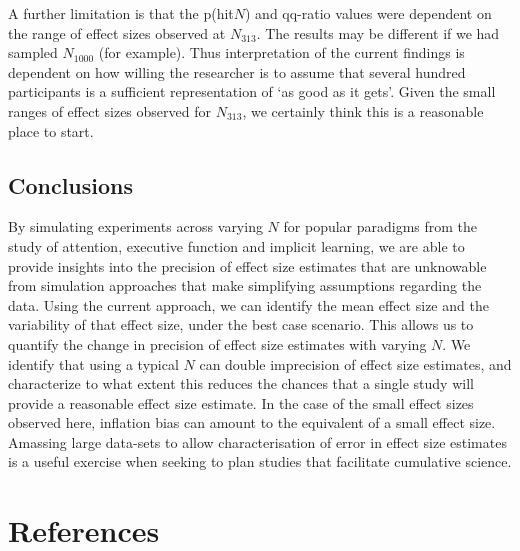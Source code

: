 \documentclass[
  man]{apa6}
\begin{document}
A further limitation is that the p(hit\textbar{}\(N\)) and qq-ratio values were dependent on the range of effect sizes observed at \(N_{313}\). The results may be different if we had sampled \(N_{1000}\) (for example). Thus interpretation of the current findings is dependent on how willing the researcher is to assume that several hundred participants is a sufficient representation of `as good as it gets'. Given the small ranges of effect sizes observed for \(N_{313}\), we certainly think this is a reasonable place to start.

\hypertarget{conclusions}{%
\subsection{Conclusions}\label{conclusions}}

By simulating experiments across varying \(N\) for popular paradigms from the study of attention, executive function and implicit learning, we are able to provide insights into the precision of effect size estimates that are unknowable from simulation approaches that make simplifying assumptions regarding the data. Using the current approach, we can identify the mean effect size and the variability of that effect size, under the best case scenario. This allows us to quantify the change in precision of effect size estimates with varying \(N\). We identify that using a typical \(N\) can double imprecision of effect size estimates, and characterize to what extent this reduces the chances that a single study will provide a reasonable effect size estimate. In the case of the small effect sizes observed here, inflation bias can amount to the equivalent of a small effect size. Amassing large data-sets to allow characterisation of error in effect size estimates is a useful exercise when seeking to plan studies that facilitate cumulative science.

\clearpage

\hypertarget{references}{%
\section{References}\label{references}}

\label{sec:Refref}
\end{document}
